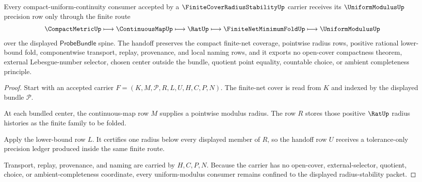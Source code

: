 \begin{theorem}
\label{thm:finite-cover-radius-stability-uniform-modulus-handoff}
Every compact-uniform-continuity consumer accepted by a $\FiniteCoverRadiusStabilityUp$ carrier receives its $\UniformModulusUp$ precision row only through the finite route
$$
\CompactMetricUp \longmapsto \ContinuousMapUp \longmapsto \RatUp \longmapsto \FiniteNetMinimumFoldUp \longmapsto \UniformModulusUp
$$
over the displayed $\mathsf{ProbeBundle}$ spine. The handoff preserves the compact finite-net coverage, pointwise radius rows, positive rational lower-bound fold, componentwise transport, replay, provenance, and local naming rows, and it exports no open-cover compactness theorem, external Lebesgue-number selector, chosen center outside the bundle, quotient point equality, countable choice, or ambient completeness principle.
\end{theorem}
\begin{proof}
Start with an accepted carrier $F=(K,M,\mathcal{P},R,L,U,H,C,P,N)$. The finite-net cover is read from $K$ and indexed by the displayed bundle $\mathcal{P}$.

At each bundled center, the continuous-map row $M$ supplies a pointwise modulus radius. The row $R$ stores those positive $\RatUp$ radius histories as the finite family to be folded.

Apply the lower-bound row $L$. It certifies one radius below every displayed member of $R$, so the handoff row $U$ receives a tolerance-only precision ledger produced inside the same finite route.

Transport, replay, provenance, and naming are carried by $H,C,P,N$. Because the carrier has no open-cover, external-selector, quotient, choice, or ambient-completeness coordinate, every uniform-modulus consumer remains confined to the displayed radius-stability packet.
\end{proof}


